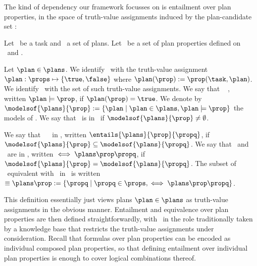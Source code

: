 The kind of dependency our framework focusses on is entailment over
plan properties, in the space of truth-value assignments induced by
the plan-candidate set \plans:

\begin{definition}[Entailment]
Let \task\ be a task and \plans\ a set of plans. Let \props\ be a set
of plan properties defined on \task\ and \plans.

Let $\plan \in \plans$. We identify \plan\ with the truth-value
assignment $\plan : \props \mapsto \{\true, \false\}$ where
$\plan(\prop) := \prop(\task,\plan)$. We identify \plans\ with the set
of such truth-value assignments. We say that
\plan\  \prop, written $\plan \models \prop$, if
$\plan(\prop) = \true$. We denote by $\modelsof{\plans}{\prop} :=
\{\plan \mid \plan \in \plans, \plan \models \prop\}$ the models of
\prop. We say that \prop\ is  in \plans\ if
$\modelsof{\plans}{\prop} \neq \emptyset$.

We say that \prop\  \propq\ in \plans, written
$\entails{\plans}{\prop}{\propq}$, if $\modelsof{\plans}{\prop}
\subseteq \modelsof{\plans}{\propq}$.
%
We say that \prop\ and \propq\ are  in \plans,
written $\iff{\plans}{\prop}{\propq}$, if $\modelsof{\plans}{\prop} =
\modelsof{\plans}{\propq}$. The subset of \props\ equivalent with
\prop\ in \plans\ is written $\equiv{\plans}{\prop} := \{\propq \mid
\propq \in \props, \iff{\plans}{\prop}{\propq}\}$.
\end{definition}

This definition essentially just views plans $\plan \in \plans$ as
truth-value assignments in the obvious manner. Entailment and
equivalence over plan properties are then defined straightforwardly,
with \plans\ in the role traditionally taken by a knowledge base that
restricts the truth-value assignments under consideration. Recall that
formulas over plan properties can be encoded as individual composed
plan properties, so that defining entailment over individual plan
properties is enough to cover logical combinations thereof.

